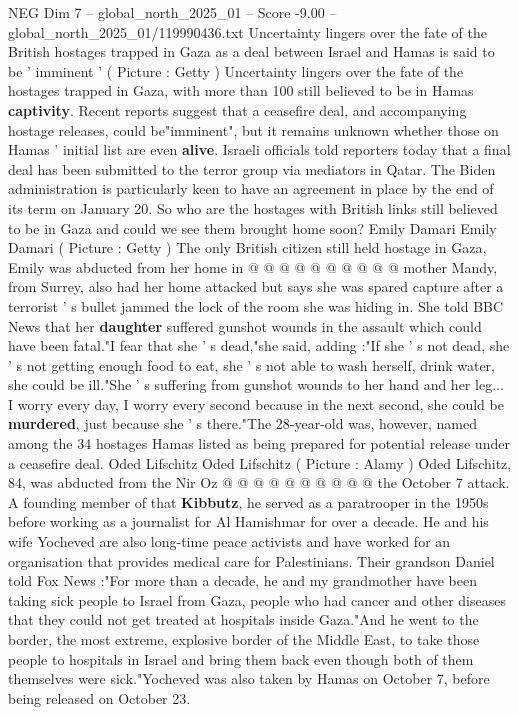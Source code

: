 \begin{textsample}{NEG Dim 7 – global\_north\_2025\_01 – Score -9.00 – global\_north\_2025\_01/119990436.txt}  \label{ex:f7_neg_060}
Uncertainty lingers over the fate of the British hostages trapped in Gaza as a deal between Israel and Hamas is said to be ' imminent ' ( Picture : Getty ) Uncertainty lingers over the fate of the hostages trapped in Gaza, with more than 100 still believed to be in Hamas \textbf{captivity}.
Recent reports suggest that a ceasefire deal, and accompanying hostage releases, could be"imminent", but it remains unknown whether those on Hamas ' initial list are even \textbf{alive}.
Israeli officials told reporters today that a final deal has been submitted to the terror group via mediators in Qatar.
The Biden administration is particularly keen to have an agreement in place by the end of its term on January 20.
So who are the hostages with British links still believed to be in Gaza and could we see them brought home soon?
Emily Damari Emily Damari ( Picture : Getty ) The only British citizen still held hostage in Gaza, Emily was abducted from her home in @ @ @ @ @ @ @ @ @ @ mother Mandy, from Surrey, also had her home attacked but says she was spared capture after a terrorist ' s bullet jammed the lock of the room she was hiding in.
She told BBC News that her \textbf{daughter} suffered gunshot wounds in the assault which could have been fatal."I fear that she ' s dead,"she said, adding :"If she ' s not dead, she ' s not getting enough food to eat, she ' s not able to wash herself, drink water, she could be ill."She ' s suffering from gunshot wounds to her hand and her leg...
I worry every day, I worry every second because in the next second, she could be \textbf{murdered}, just because she ' s there."The 28-year-old was, however, named among the 34 hostages Hamas listed as being prepared for potential release under a ceasefire deal.
Oded Lifschitz Oded Lifschitz ( Picture : Alamy ) Oded Lifschitz, 84, was abducted from the Nir Oz @ @ @ @ @ @ @ @ @ @ the October 7 attack.
A founding member of that \textbf{Kibbutz}, he served as a paratrooper in the 1950s before working as a journalist for Al Hamishmar for over a decade.
He and his wife Yocheved are also long-time peace activists and have worked for an organisation that provides medical care for Palestinians.
Their grandson Daniel told Fox News :"For more than a decade, he and my grandmother have been taking sick people to Israel from Gaza, people who had cancer and other diseases that they could not get treated at hospitals inside Gaza."And he went to the border, the most extreme, explosive border of the Middle East, to take those people to hospitals in Israel and bring them back even though both of them themselves were sick."Yocheved was also taken by Hamas on October 7, before being released on October 23.

\end{textsample}
